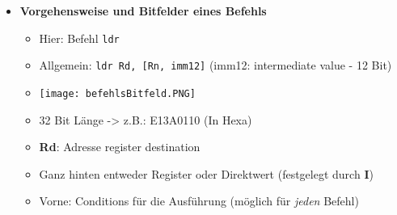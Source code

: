 \begin{itemize}
        \item \textbf{Vorgehensweise und Bitfelder eines Befehls}
            \begin{itemize}
                \item Hier: Befehl \texttt{ldr}
                \item Allgemein: \texttt{ldr Rd, [Rn, imm12]} (imm12: intermediate value - 12 Bit)
                \item[] \texttt{[image: befehlsBitfeld.PNG]}
                \item 32 Bit Länge -> z.B.: E13A0110 (In Hexa)
                \item \textbf{Rd}: Adresse register destination
                \item Ganz hinten entweder Register oder Direktwert (festgelegt durch \textbf{I})
                \item Vorne: Conditions für die Ausführung (möglich für \textit{jeden} Befehl)
            \end{itemize}
    \end{itemize}

